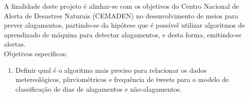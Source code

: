 A finalidade deste projeto é alinhar-se com os objetivos do Centro Nacional de Alerta de Desastres Naturais (CEMADEN) no desenvolvimento de meios para prever alagamentos, partindo-se da hipótese que é possível utilizar algoritmos de aprendizado de máquina para detectar alagamentos, e desta forma, emitindo-se alertas. \\
Objetivos específicos: 
\begin{enumerate}
    \item Definir qual é o algoritmo mais preciso para relacionar os dados metereológicos, pluviométricos e frequência de tweets para o modelo de classificação de dias de alagamentos e não-alagamentos. 
\end{enumerate}
